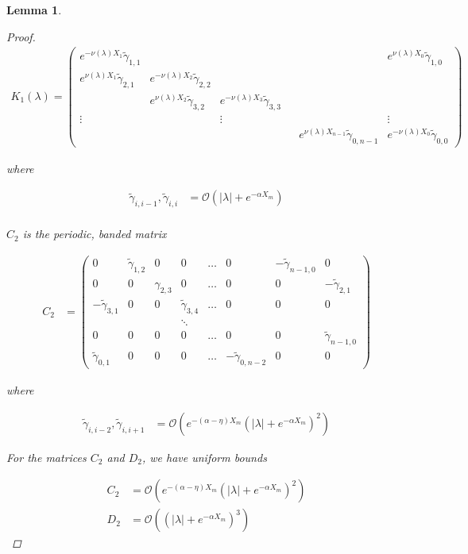 \documentclass[12pt]{article}
\newtheorem{lemma}{Lemma}
\begin{document}
\begin{lemma}
\begin{proof}
\begin{align*}
K_1(\lambda) =  
\begin{pmatrix}
e^{-\nu(\lambda)X_1} \tilde{\gamma}_{1,1} & & & & & e^{\nu(\lambda)X_0}\tilde{\gamma}_{1,0} \\
e^{\nu(\lambda)X_1}\tilde{\gamma}_{2,1} & e^{-\nu(\lambda)X_2}\tilde{\gamma}_{2,2} \\
& e^{\nu(\lambda)X_2}\tilde{\gamma}_{3,2} & e^{-\nu(\lambda)X_3}\tilde{\gamma}_{3,3} \\
\vdots & & \vdots & &&  \vdots \\
& & & & e^{\nu(\lambda)X_{n-1}}\tilde{\gamma}_{0,n-1} & e^{-\nu(\lambda)X_0}\tilde{\gamma}_{0,0} 
\end{pmatrix}
\end{align*}

where 

\begin{align*}
\tilde{\gamma}_{i,i-1}, \tilde{\gamma}_{i,i} &= \mathcal{O}(|\lambda| + e^{-\alpha X_m}) \\
\end{align*}

$C_2$ is the periodic, banded matrix

\begin{align*}
C_2 &= \begin{pmatrix}
0 & \tilde{\gamma}_{1,2} & 0 & 0 & \dots & 0 & -\tilde{\gamma}_{n-1,0} & 0 \\
0 & 0 & \gamma_{2,3} & 0 & \dots & 0 & 0 & -\tilde{\gamma}_{2,1} \\
-\tilde{\gamma}_{3,1} & 0 & 0 & \tilde{\gamma}_{3,4} & \dots & 0 & 0 & 0 \\
&  & & \ddots  \\
0 & 0 & 0 & 0 & \dots & 0 & 0 & \tilde{\gamma}_{n-1,0} \\
\tilde{\gamma}_{0,1} & 0 & 0 & 0 & \dots & -\tilde{\gamma}_{0, n-2} & 0 & 0 
\end{pmatrix}
\end{align*}

where

\begin{align*}
\tilde{\gamma}_{i,i-2}, \tilde{\gamma}_{i,i+1} &= \mathcal{O}(e^{-(\alpha - \eta) X_m}(|\lambda| + e^{-\alpha X_m})^2) 
\end{align*}

For the matrices $C_2$ and $D_2$, we have uniform bounds

\begin{align*}
C_2 &= \mathcal{O}(e^{-(\alpha - \eta) X_m}(|\lambda| + e^{-\alpha X_m})^2) \\
D_2 &= \mathcal{O}((|\lambda| + e^{-\alpha X_m})^3)
\end{align*}

\end{proof}
\end{lemma}
\end{document}
